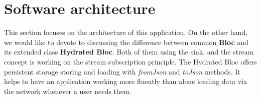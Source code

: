 \section{Software architecture}\label{sec:software-architecture}
This section focuses on the architecture of this application.
On the other hand, we would like to devote to discussing the difference between common \textbf{Bloc} and its extended class \textbf{Hydrated Bloc}.
Both of them using the sink, and the stream concept is working on the stream subscription principle.
The Hydrated Bloc offers persistent storage storing and loading with \textit{fromJson} and \textit{toJson} methods.
It helps to have an application working more fluently than alone loading data via the network whenever a user needs them.









